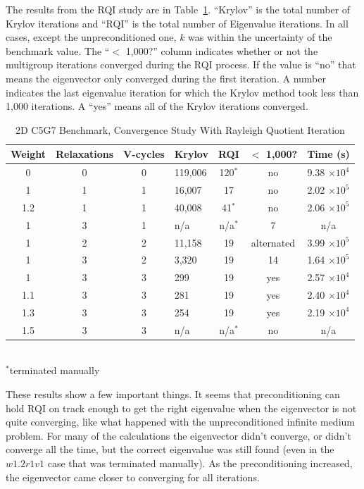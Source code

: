The results from the RQI study are in Table~\ref{table:2D c5g7 rqi}. ``Krylov'' is the total number of Krylov iterations and ``RQI'' is the total number of Eigenvalue iterations. In all cases, except the unpreconditioned one, $k$ was within the uncertainty of the benchmark value. The ``$<$ 1,000?'' column indicates whether or not the multigroup iterations converged during the RQI process. If the value is ``no'' that means the eigenvector only converged during the first iteration. A number indicates the last eigenvalue iteration for which the Krylov method took less than 1,000 iterations. A ``yes'' means all of the Krylov iterations converged.
%
\begin{table}[!h]
\caption{2D C5G7 Benchmark, Convergence Study With Rayleigh Quotient Iteration}
\begin{center}
\begin{tabular}{c c c l c c c}
\hline
Weight & Relaxations & V-cycles & Krylov & RQI & $<$ 1,000? & Time (s) \\[0.5ex]
\hline
0    & 0 & 0 & 119,006 & 120$^{*}$ & no &9.38 $\times 10^{4}$ \\
1    & 1 & 1 & 16,007   & 17            & no & 2.02 $\times 10^{5}$ \\
1.2 & 1 & 1 & 40,008   & 41$^{*}$   & no & 2.06 $\times 10^{5}$ \\
1    & 3 & 1 & n/a         & n/a$^{*}$  & 7   & n/a \\
1    & 2 & 2 & 11,158   & 19            & alternated & 3.99 $\times 10^{5}$ \\
1    & 3 & 2 & 3,320     & 19            & 14 & 1.64 $\times 10^{5}$ \\
\hline
1    & 3 & 3 & 299        & 19            & yes & 2.57 $\times 10^{4}$ \\
1.1 & 3 & 3 & 281        & 19            & yes & 2.40 $\times 10^{4}$ \\
1.3 & 3 & 3 & 254        & 19            & yes & 2.19 $\times 10^{4}$ \\
1.5 & 3 & 3 & n/a         & n/a$^{*}$ & no & n/a \\
\hline 
\end{tabular} \\
$^{*}$terminated manually
\end{center}
\label{table:2D c5g7 rqi}
\end{table}
%

These results show a few important things. It seems that preconditioning can hold RQI on track enough to get the right eigenvalue when the eigenvector is not quite converging, like what happened with the unpreconditioned infinite medium problem. For many of the calculations the eigenvector didn't converge, or didn't converge all the time, but the correct eigenvalue was still found (even in the $w1.2r1v1$ case that was terminated manually). As the preconditioning increased, the eigenvector came closer to converging for all iterations. 

